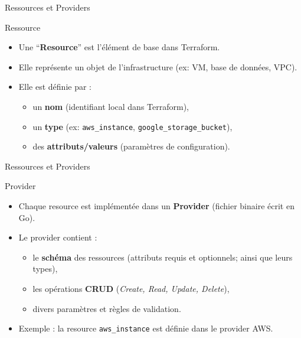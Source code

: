 \documentclass[aspectratio=169,10pt]{beamer}
\begin{document}

\begin{frame}{Ressources et Providers}

\begin{alertblock}{Ressource}
\begin{itemize}
    \item Une ``\textbf{Resource}'' est l’élément de base dans Terraform. 
    \item Elle représente un objet de l’infrastructure (ex: VM, base de données, VPC).
    \item Elle est définie par :
        \begin{itemize}
            \item un \textbf{nom} (identifiant local dans Terraform),
            \item un \textbf{type} (ex: \texttt{aws\_instance}, \texttt{google\_storage\_bucket}),
            \item des \textbf{attributs/valeurs} (paramètres de configuration).
        \end{itemize}
\end{itemize}
\end{alertblock}

\end{frame}

\begin{frame}{Ressources et Providers}

\begin{alertblock}{Provider}
\begin{itemize}
    \item Chaque resource est implémentée dans un \textbf{Provider} (fichier binaire écrit en Go).
    \item Le provider contient :
        \begin{itemize}
            \item le \textbf{schéma} des ressources (attributs requis et optionnels; ainsi que leurs types),
            \item les opérations \textbf{CRUD} (\emph{Create, Read, Update, Delete}),
            \item divers paramètres et règles de validation.
        \end{itemize}
    \item Exemple : la resource \texttt{aws\_instance} est définie dans le provider AWS.
\end{itemize}
\end{alertblock}

\end{frame}
\end{document}
